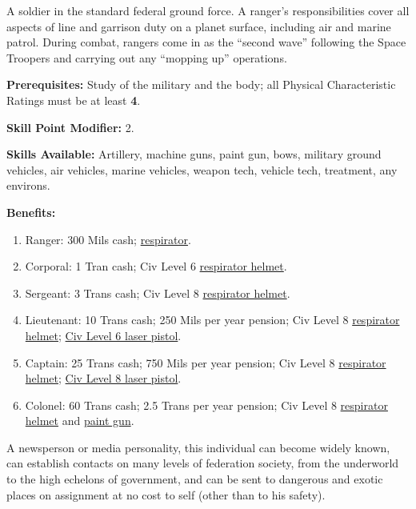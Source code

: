 \bigskip

\pagebreak[2]

\label{sec:prof-ranger}

A soldier in the standard federal ground force. A ranger's
responsibilities cover all aspects of line and garrison duty on a
planet surface, including air and marine patrol. During combat,
rangers come in as the ``second wave'' following the Space Troopers
and carrying out any ``mopping up'' operations.

\textbf{Prerequisites:} Study of the military and the body; all
 Physical Characteristic Ratings must be at least  \textbf{4}.

\textbf{Skill Point Modifier:} 2.  

\textbf{Skills Available:} Artillery, machine guns, paint gun, bows,
military ground vehicles, air vehicles, marine vehicles, weapon tech,
vehicle tech, treatment, any environs.

\pagebreak[2]
\pagebreak[2]
\textbf{Benefits:}
\begin{enumerate}
\item Ranger: 300 Mils cash; \hyperlink{tag:respirator}{respirator}.
\item Corporal: 1 Tran cash; Civ Level 6 \hyperlink{tag:respirator-helmet}{respirator helmet}.
\item Sergeant: 3 Trans cash; Civ Level 8 \hyperlink{tag:respirator-helmet}{respirator helmet}.
\item Lieutenant: 10 Trans cash; 250 Mils per year pension; Civ Level
  8 \hyperlink{tag:respirator-helmet}{respirator helmet}; \hyperlink{tag:cl6-laser}{Civ Level 6 laser pistol}.
\item Captain: 25 Trans cash; 750 Mils per year pension; Civ Level 8
  \hyperlink{tag:respirator-helmet}{respirator helmet}; \hyperlink{tag:cl8-laser}{Civ Level 8 laser pistol}.
\item Colonel: 60 Trans cash; 2.5 Trans per year pension; Civ Level 8
  \hyperlink{tag:respirator-helmet}{respirator helmet} and \hyperlink{tag:cl8-paintgun}{paint gun}.
\end{enumerate}

\bigskip

\pagebreak[2]

\label{sec:prof-reporter-journalist}

A newsperson or media personality, this individual can become widely
known, can establish contacts on many levels of federation society,
from the underworld to the high echelons of government, and can be
sent to dangerous and exotic places on assignment at no cost to self
(other than to his safety).


